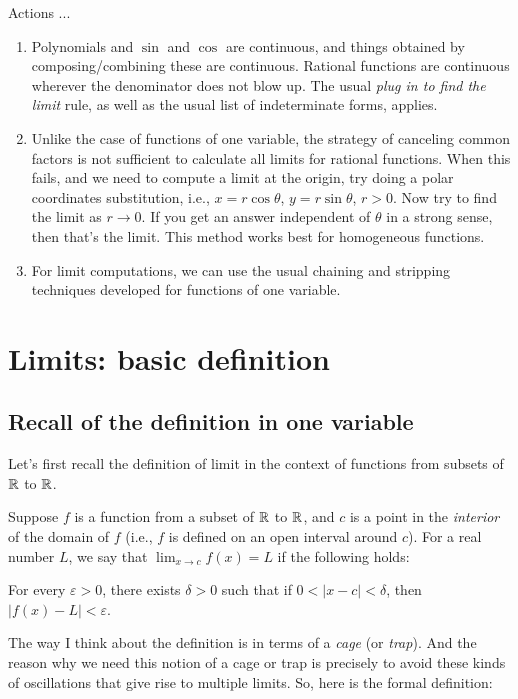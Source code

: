 \documentclass[10pt]{amsart}
\begin{document}
Actions ...

\begin{enumerate}
\item Polynomials and $\sin$ and $\cos$ are continuous, and things
  obtained by composing/combining these are continuous. Rational
  functions are continuous wherever the denominator does not blow
  up. The usual {\em plug in to find the limit} rule, as well as the
  usual list of indeterminate forms, applies.
\item Unlike the case of functions of one variable, the strategy of
  canceling common factors is not sufficient to calculate all limits
  for rational functions. When this fails, and we need to compute a
  limit at the origin, try doing a polar coordinates substitution,
  i.e., $x = r\cos \theta$, $y = r \sin \theta$, $r > 0$. Now try to
  find the limit as $r \to 0$. If you get an answer independent of
  $\theta$ in a strong sense, then that's the limit. This method works
  best for homogeneous functions.
\item For limit computations, we can use the usual chaining and
  stripping techniques developed for functions of one variable.
\end{enumerate}

\section{Limits: basic definition}

\subsection{Recall of the definition in one variable}

Let's first recall the definition of limit in the context of functions
from subsets of $\mathbb{R}$ to $\mathbb{R}$.

Suppose $f$ is a function from a subset of $\mathbb{R}$ to $\mathbb{R}$, and $c$ is a
point in the {\em interior} of the domain of $f$ (i.e., $f$ is defined
on an open interval around $c$). For a real number $L$, we say that
$\lim_{x \to c} f(x) = L$ if the following holds:

For every $\varepsilon > 0$, there exists $\delta > 0$ such that if $0 <
|x - c| < \delta$, then $|f(x) - L| < \varepsilon$.

The way I think about the definition is in terms of a {\em cage} (or
{\em trap}). And the reason why we need this notion of a cage or trap
is precisely to avoid these kinds of oscillations that give rise to
multiple limits. So, here is the formal definition:
\end{document}
